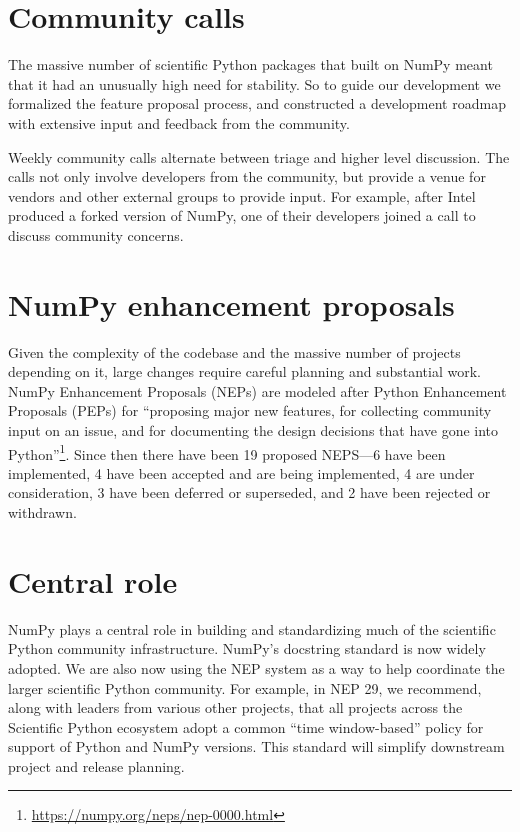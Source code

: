 \documentclass{article}
\begin{document}
\section*{Community calls}

The massive number of scientific Python packages that
built on NumPy meant that it had an unusually high need for stability.
So to guide our development we formalized the feature proposal process, and
constructed a development roadmap with extensive input and feedback from the
community.


Weekly community calls alternate between triage and
higher level discussion.  The calls not only involve developers from
the community, but provide a venue for vendors and other external
groups to provide input.  For example, after Intel produced a forked
version of NumPy, one of their developers joined a call to discuss
community concerns.

\section*{NumPy enhancement proposals}

Given the complexity of the codebase and the massive number of projects depending
on it, large changes require careful planning and substantial work.
NumPy Enhancement Proposals (NEPs) are modeled after
Python Enhancement Proposals (PEPs) for ``proposing major new
features, for collecting community input on an issue, and for
documenting the design decisions that have gone into
Python''\footnote{\url{https://numpy.org/neps/nep-0000.html}}.
Since then there have been 19 proposed NEPS---6 have been implemented,
4 have been accepted and are being implemented, 4 are under
consideration, 3 have been deferred or superseded, and 2 have been rejected
or withdrawn.


\section*{Central role}

NumPy plays a central role in building and standardizing much of the scientific
Python community infrastructure.
NumPy's docstring standard is now widely adopted.
We are also now using the NEP system as a way to help coordinate the larger
scientific Python community.
For example, in NEP 29, we recommend, along with leaders from various other
projects, that all projects across the Scientific Python ecosystem adopt a
common ``time window-based'' policy for support of Python and NumPy versions.
This standard will simplify downstream project and release planning.
\end{document}
